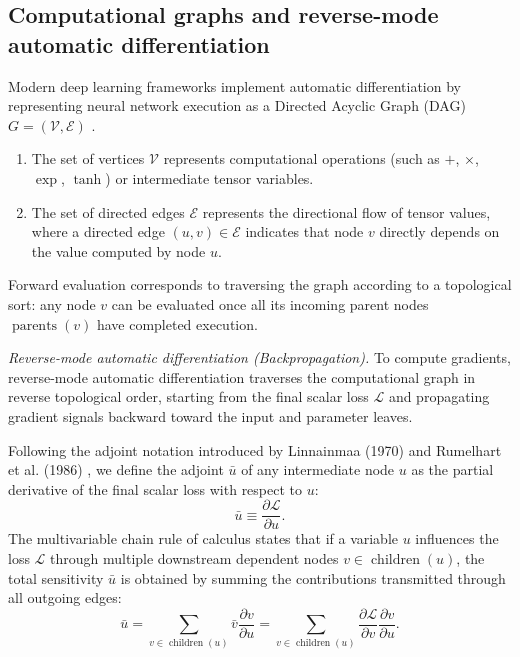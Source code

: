 \documentclass[../../../main.tex]{subfiles}
\begin{document}
\subsection{Computational graphs and reverse-mode automatic differentiation}
\label{subsec:dag_reverse_autodiff}

Modern deep learning frameworks implement automatic differentiation by representing neural network execution as a Directed Acyclic Graph (DAG) $G = (\mathcal{V}, \mathcal{E})$ \citep{goodfellow2016,bishop2024deep}.
\begin{enumerate}[label=(\roman*)]
    \item The set of vertices $\mathcal{V}$ represents computational operations (such as $+$, $\times$, $\exp$, $\tanh$) or intermediate tensor variables.
    \item The set of directed edges $\mathcal{E}$ represents the directional flow of tensor values, where a directed edge $(u, v) \in \mathcal{E}$ indicates that node $v$ directly depends on the value computed by node $u$.
\end{enumerate}

Forward evaluation corresponds to traversing the graph according to a topological sort: any node $v$ can be evaluated once all its incoming parent nodes $\operatorname{parents}(v)$ have completed execution.

\textit{Reverse-mode automatic differentiation (Backpropagation).} To compute gradients, reverse-mode automatic differentiation traverses the computational graph in reverse topological order, starting from the final scalar loss $\mathcal{L}$ and propagating gradient signals backward toward the input and parameter leaves.

Following the adjoint notation introduced by Linnainmaa (1970) and Rumelhart et al. (1986) \citep{rumelhart1986}, we define the adjoint $\bar{u}$ of any intermediate node $u$ as the partial derivative of the final scalar loss with respect to $u$:
\begin{equation}
\bar{u} \equiv \frac{\partial \mathcal{L}}{\partial u}.
\end{equation}
The multivariable chain rule of calculus states that if a variable $u$ influences the loss $\mathcal{L}$ through multiple downstream dependent nodes $v \in \operatorname{children}(u)$, the total sensitivity $\bar{u}$ is obtained by summing the contributions transmitted through all outgoing edges:
\begin{equation}
\bar{u} = \sum_{v \in \operatorname{children}(u)} \bar{v} \frac{\partial v}{\partial u} = \sum_{v \in \operatorname{children}(u)} \frac{\partial \mathcal{L}}{\partial v} \frac{\partial v}{\partial u}.
\label{eq:adjoint_chain_rule}
\end{equation}
\end{document}
